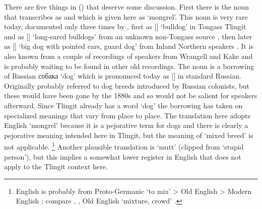 There are five things in (\lastx) that deserve some discussion.
First there is the noun that \citeauthor{swanton:1909} transcribes as  and which is given here as  ‘mongrel’.
This noun is very rare today, documented only three times by \citeauthor{leer:1973}, first as  [] ‘bulldog’ in Tongass Tlingit and as  [] ‘long-eared bulldogs’ from an unknown non-Tongass source \parencite[03/275]{leer:1973}, then later as  [] ‘big dog with pointed ears, guard dog’ from Inland Northern speakers \parencite[\textsc{t}·57]{leer:2001}.
It is also known from a couple of recordings of speakers from Wrangell and Kake and is probably waiting to be found in other old recordings.
The noun  is a borrowing of Russian собака  ‘dog’ which is pronounced today as [] in standard Russian.
Originally  probably referred to dog breeds introduced by Russian colonists, but these would have been gone by the 1880s and so would not be salient for speakers afterward.
Since Tlingit already has a word  ‘dog’ the borrowing  has taken on specialized meanings that vary from place to place.
The translation here adopts English ‘mongrel’ because it is a pejorative term for dogs and there is clearly a pejorative meaning intended here in Tlingit, but the meaning of ‘mixed breed’ is not applicable.%
\footnote{English  is probably from Proto-Germanic  ‘to mix’ > Old English  > Modern English ; compare , , Old English  ‘mixture, crowd’ \parencite[353]{kroonen:2013}.}
Another plausible translation is ‘mutt’ (clipped from  ‘stupid person’), but this implies a somewhat lower register in English that does not apply to the Tlingit context here.


